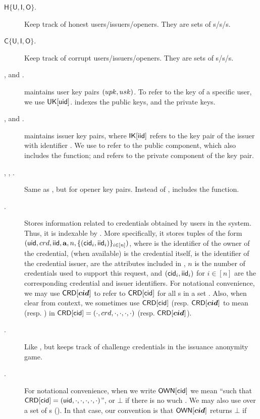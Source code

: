 \begin{description}
\item[$\mathsf{H}\lbrace\mathsf{U},\mathsf{I},\mathsf{O} \rbrace$.] Keep
  track of honest users/issuers/openers. They are sets of
  {\uid}s/{\iid}s/{\oid}s.
\item[$\mathsf{C}\lbrace\mathsf{U},\mathsf{I},\mathsf{O} \rbrace$.] Keep
  track of corrupt users/issuers/openers. They are sets of
  {\uid}s/{\iid}s/{\oid}s.    
\item[\UK, \PUBUK and \PRVUK.] \UK maintains user key pairs $(upk,usk)$. To
  refer to the key of a specific user, we use $\mathsf{UK}[\mathsf{uid}]$. \PUBUK indexes the
  public keys, and \PRVUK the private keys.
\item[\IK, \PUBIK and \PRVIK.] \IK maintains issuer key pairs, where
  $\mathsf{IK}[\mathsf{iid}]$ refers to the key pair of the issuer with identifier \iid. We
  use \PUBIK to refer to the public component, which also includes the \fissue
  function; and \PRVIK refers to the private component of the key pair.
\item[\OK, \PUBOK, \PRVOK.] Same as \IK, but for opener key pairs. Instead
  of \fissue, \OK includes the \finsp function.
\item[\CRED.] Stores information related to credentials obtained by users in
  the system. Thus, it is indexable by \cid. More specifically, it stores
  tuples of the form $(\mathsf{uid},crd,\mathsf{iid},\mathbf{a},n,\lbrace (\mathsf{cid}_i,\mathsf{iid}_i)
  \rbrace_{i \in [n]})$, where \uid is the identifier of the owner of the
  credential, \cred (when available) is the credential itself, \iid is the
  identifier of the credential issuer, \attrs are the attributes included in
  \cred, $n$ is the number of credentials used to support this request, and
  $(\mathsf{cid}_i,\mathsf{iid}_i)$ for $i \in [n]$ are the corresponding credential and issuer
  identifiers. For notational convenience, we may use $\mathsf{CRD}[\boldsymbol{cid}]$
  to refer to $\mathsf{CRD}[\mathsf{cid}]$ for all {\cid}s in a set \scid. Also, when clear
  from context, we sometimes use $\mathsf{CRD}[\mathsf{cid}]$ (resp. $\mathsf{CRD}[\boldsymbol{cid}]$ to
  mean \cred (resp. \scred) in $\mathsf{CRD}[\mathsf{cid}] = (\cdot,crd,\cdot,\cdot,
  \cdot,\cdot)$ (resp. $\mathsf{CRD}[\boldsymbol{cid}]$).
\item[\CCRED.] Like \CRED, but keeps track of challenge credentials in the
  issuance anonymity game.
\item[\OWNR.] For notational convenience, when we write $\mathsf{OWN}[\mathsf{cid}]$ we mean
  ``\uid such that $\mathsf{CRD}[\mathsf{cid}] = (\mathsf{uid},\cdot,\cdot,\cdot,\cdot,\cdot)$'', or
  $\bot$ if there is no wuch \uid. We may also use \OWNR over a set of {\cid}s
  (\scid). In that case, our convention is that $\mathsf{OWN}[\boldsymbol{cid}]$ returns $\bot$ if

\end{description}
